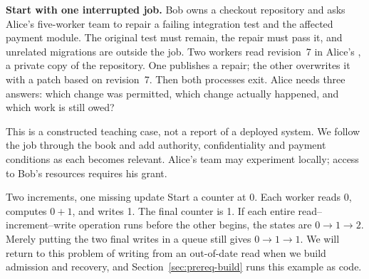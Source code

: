 \fi
\makeatother
{}

\pdchapteropeningprereq

\ifdefined\pdswisslandmarkplate
\begin{figure}[p]
  \centering
\end{figure}
\fi

\setlength{\emergencystretch}{2em}

\noindent\textbf{Start with one interrupted job.}
Bob owns a checkout repository and asks Alice's five-worker team to repair a
failing integration test and the affected payment module. The original test
must remain, the repair must pass it, and unrelated migrations are outside the
job. Two workers read revision~7 in Alice's , a private copy
of the repository. One publishes a
repair; the other overwrites it with a patch based on revision~7. Then both
processes exit. Alice needs three answers: which change was permitted, which
change actually happened, and which work is still owed?

This is a constructed teaching case, not a report of a deployed system. We
follow the job through the book and add authority, confidentiality and payment
conditions as each becomes relevant. Alice's team may experiment locally;
access to Bob's resources requires his grant.

\begin{pdexample}{Two increments, one missing update}
Start a counter at 0. Each worker reads 0, computes $0+1$, and writes 1.
The final counter is 1. If each entire read--increment--write operation runs
before the other begins, the states are $0\to1\to2$. Merely putting the two
final writes in a queue still gives $0\to1\to1$. We will return to this
problem of writing from an out-of-date read when we build admission and
recovery, and Section~\ref{sec:prereq-build} runs this example as code.
\end{pdexample}

